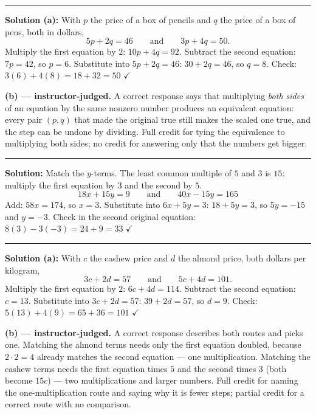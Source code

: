 \documentclass[12pt]{article}
\begin{document}
\vspace{0.2cm}\noindent\rule{\linewidth}{0.2pt}


\textbf{Solution (a):} With $p$ the price of a box of pencils and $q$ the price of a box of pens, both in dollars,
\[ 5p + 2q = 46 \qquad\text{and}\qquad 3p + 4q = 50. \]
Multiply the first equation by $2$: $10p + 4q = 92$. Subtract the second equation: $7p = 42$, so $p = 6$. Substitute into $5p + 2q = 46$: $30 + 2q = 46$, so $q = 8$. Check: $3(6) + 4(8) = 18 + 32 = 50$ $\checkmark$ 

\textbf{(b) --- instructor-judged.} A correct response says that multiplying \emph{both sides} of an equation by the same nonzero number produces an equivalent equation: every pair $(p,q)$ that made the original true still makes the scaled one true, and the step can be undone by dividing. Full credit for tying the equivalence to multiplying both sides; no credit for answering only that the numbers get bigger.

\vspace{0.2cm}\noindent\rule{\linewidth}{0.2pt}


\textbf{Solution:} Match the $y$-terms. The least common multiple of $5$ and $3$ is $15$: multiply the first equation by $3$ and the second by $5$.
\[ 18x + 15y = 9 \qquad\text{and}\qquad 40x - 15y = 165 \]
Add: $58x = 174$, so $x = 3$. Substitute into $6x + 5y = 3$: $18 + 5y = 3$, so $5y = -15$ and $y = -3$. Check in the second original equation: $8(3) - 3(-3) = 24 + 9 = 33$ $\checkmark$ 

\vspace{0.2cm}\noindent\rule{\linewidth}{0.2pt}


\textbf{Solution (a):} With $c$ the cashew price and $d$ the almond price, both dollars per kilogram,
\[ 3c + 2d = 57 \qquad\text{and}\qquad 5c + 4d = 101. \]
Multiply the first equation by $2$: $6c + 4d = 114$. Subtract the second equation: $c = 13$. Substitute into $3c + 2d = 57$: $39 + 2d = 57$, so $d = 9$. Check: $5(13) + 4(9) = 65 + 36 = 101$ $\checkmark$ 

\textbf{(b) --- instructor-judged.} A correct response describes both routes and picks one. Matching the almond terms needs only the first equation doubled, because $2 \cdot 2 = 4$ already matches the second equation --- one multiplication. Matching the cashew terms needs the first equation times $5$ and the second times $3$ (both become $15c$) --- two multiplications and larger numbers. Full credit for naming the one-multiplication route and saying why it is fewer steps; partial credit for a correct route with no comparison.
\end{document}
